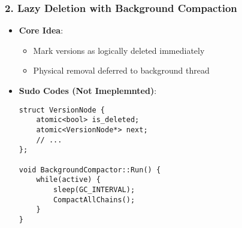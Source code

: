 \documentclass[a4 paper,12pt]{article}
\theoremstyle{definitionstyle}
\begin{document}
\subsubsection{2. Lazy Deletion with Background Compaction}
\begin{itemize}[leftmargin=*]
    \item \textbf{Core Idea}:
    \begin{itemize}
        \item Mark versions as logically deleted immediately
        \item Physical removal deferred to background thread
    \end{itemize}
    
    \item \textbf{Sudo Codes (Not Imeplemnted)}:
    \begin{verbatim}
struct VersionNode {
    atomic<bool> is_deleted;
    atomic<VersionNode*> next;
    // ...
};

void BackgroundCompactor::Run() {
    while(active) {
        sleep(GC_INTERVAL);
        CompactAllChains();
    }
}
    \end{verbatim}
    
\end{itemize}
\end{document}
